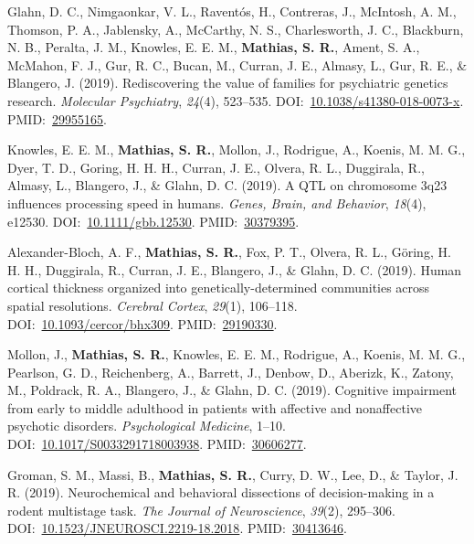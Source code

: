 \documentclass[10pt]{article}
\makeatletter
\newlength{\bibhang}
\newlength{\bibsep}
 {\@listi \global\bibsep\itemsep \global\advance\bibsep by\parsep}
\newenvironment{bibsection}%
        {\vspace{-\baselineskip}\begin{list}{}{%
       \setlength{\leftmargin}{\bibhang}%
       \setlength{\itemindent}{-\leftmargin}%
       \setlength{\itemsep}{\bibsep}%
       \setlength{\parsep}{\z@}%
        \setlength{\partopsep}{0pt}%
        \setlength{\topsep}{0pt}}}
        {\end{list}\vspace{-.6\baselineskip}}
\makeatother
\begin{document}
\begin{bibsection}
\item Glahn, D. C., Nimgaonkar, V. L., Raventós, H., Contreras, J., McIntosh, A. M., Thomson, P. A., Jablensky, A., McCarthy, N. S., Charlesworth, J. C., Blackburn, N. B., Peralta, J. M., Knowles, E. E. M., \textbf{Mathias, S. R.}, Ament, S. A., McMahon, F. J., Gur, R. C., Bucan, M., Curran, J. E., Almasy, L., Gur, R. E., \& Blangero, J. (2019). Rediscovering the value of families for psychiatric genetics research. \emph{Molecular Psychiatry}, \emph{24}(4), 523--535. DOI:~\href{https://doi.org/10.1038/s41380-018-0073-x}{10.1038/s41380-018-0073-x}. PMID:~\href{https://www.ncbi.nlm.nih.gov/pubmed/?term=29955165}{29955165}.
\item Knowles, E. E. M., \textbf{Mathias, S. R.}, Mollon, J., Rodrigue, A., Koenis, M. M. G., Dyer, T. D., Goring, H. H. H., Curran, J. E., Olvera, R. L., Duggirala, R., Almasy, L., Blangero, J., \& Glahn, D. C. (2019). A QTL on chromosome 3q23 influences processing speed in humans. \emph{Genes, Brain, and Behavior}, \emph{18}(4), e12530. DOI:~\href{https://doi.org/10.1111/gbb.12530}{10.1111/gbb.12530}. PMID:~\href{https://www.ncbi.nlm.nih.gov/pubmed/?term=30379395}{30379395}.
\item Alexander-Bloch, A. F., \textbf{Mathias, S. R.}, Fox, P. T., Olvera, R. L., Göring, H. H. H., Duggirala, R., Curran, J. E., Blangero, J., \& Glahn, D. C. (2019). Human cortical thickness organized into genetically-determined communities across spatial resolutions. \emph{Cerebral Cortex}, \emph{29}(1), 106--118. DOI:~\href{https://doi.org/10.1093/cercor/bhx309}{10.1093/cercor/bhx309}. PMID:~\href{https://www.ncbi.nlm.nih.gov/pubmed/?term=29190330}{29190330}.
\item Mollon, J., \textbf{Mathias, S. R.}, Knowles, E. E. M., Rodrigue, A., Koenis, M. M. G., Pearlson, G. D., Reichenberg, A., Barrett, J., Denbow, D., Aberizk, K., Zatony, M., Poldrack, R. A., Blangero, J., \& Glahn, D. C. (2019). Cognitive impairment from early to middle adulthood in patients with affective and nonaffective psychotic disorders. \emph{Psychological Medicine}, 1--10. DOI:~\href{https://doi.org/10.1017/S0033291718003938}{10.1017/S0033291718003938}. PMID:~\href{https://www.ncbi.nlm.nih.gov/pubmed/?term=30606277}{30606277}.
\item Groman, S. M., Massi, B., \textbf{Mathias, S. R.}, Curry, D. W., Lee, D., \& Taylor, J. R. (2019). Neurochemical and behavioral dissections of decision-making in a rodent multistage task. \emph{The Journal of Neuroscience}, \emph{39}(2), 295--306. DOI:~\href{https://doi.org/10.1523/JNEUROSCI.2219-18.2018}{10.1523/JNEUROSCI.2219-18.2018}. PMID:~\href{https://www.ncbi.nlm.nih.gov/pubmed/?term=30413646}{30413646}.

\end{bibsection}
\end{document}
